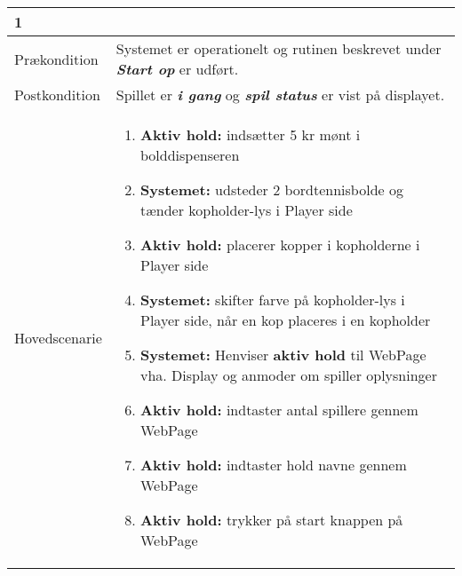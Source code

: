 \documentclass[Kravspecifikation/Kravspec_Main.tex]{subfiles}
\begin{document}
\begin{longtable}[]{@{}ll@{}}
\begin{minipage}[t]{0.47\columnwidth}
{1}\strut
\end{minipage}\tabularnewline
\toprule
\begin{minipage}[t]{0.47\columnwidth}\raggedright
{Prækondition}\strut
\end{minipage} & \begin{minipage}[t]{0.47\columnwidth}\raggedright
{Systemet er operationelt og rutinen beskrevet under \textit{\textbf{Start op}} er udført.}\strut
\end{minipage}\tabularnewline
\toprule
\begin{minipage}[t]{0.47\columnwidth}\raggedright
{Postkondition}\strut
\end{minipage} & \begin{minipage}[t]{0.47\columnwidth}\raggedright
{Spillet er \textit{\textbf{i gang}} og \textbf{\textit{spil status}} er vist på displayet.}\strut
\end{minipage}\tabularnewline
\toprule
\begin{minipage}[t]{0.47\columnwidth}\raggedright
{Hovedscenarie}\strut
\end{minipage} & \begin{minipage}[t]{0.47\columnwidth}\raggedright
\begin{enumerate}
\tightlist
\item
  {\textbf{Aktiv hold:} indsætter 5 kr mønt i bolddispenseren }
\item
  {\textbf{Systemet:} udsteder 2 bordtennisbolde og tænder kopholder-lys i Player side }
\item
  {\textbf{Aktiv hold:} placerer kopper i kopholderne i Player side}
\item {\textbf{Systemet:} skifter farve på kopholder-lys i Player side, når en kop placeres i en kopholder }
\item
  {\textbf{Systemet:} Henviser \textbf{aktiv hold} til WebPage vha. Display og anmoder om spiller oplysninger}
\item
  {\textbf{Aktiv hold:} indtaster antal spillere gennem WebPage}
\item
  {\textbf{Aktiv hold:} indtaster hold navne gennem WebPage}
\item
  {\textbf{Aktiv hold:} trykker på start knappen på WebPage}
\end{enumerate}\strut

\end{minipage}
\end{longtable}
\end{document}
